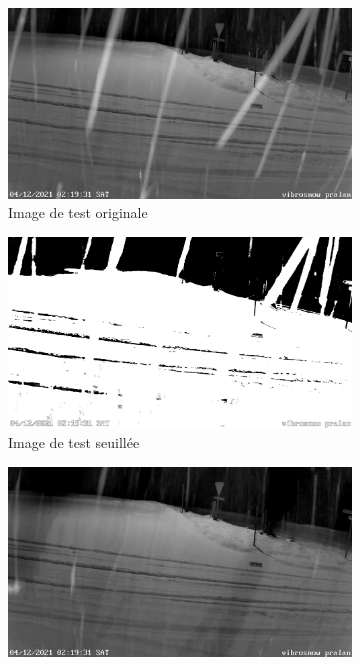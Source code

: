 \begin{figure}[H]
    \begin{subfigure}{.45\textwidth}
        \includegraphics[width=\linewidth]{Images/computer_vision/snowOnRoad/test_original.png}
        \caption{Image de test originale}
        \label{fig:SnowOnRoad_test_original}
    \end{subfigure}
    \hfill
    \begin{subfigure}{.45\textwidth}
        \includegraphics[width=\linewidth]{Images/computer_vision/snowOnRoad/test_thres.png}
        \caption{Image de test seuillée}
        \label{fig:SnowOnRoad_test_thres}
    \end{subfigure}
    \hfill
    \begin{subfigure}{.45\textwidth}
        \includegraphics[width=\linewidth]{Images/computer_vision/snowOnRoad/test_denoised.png}

\end{subfigure}
\end{figure}
